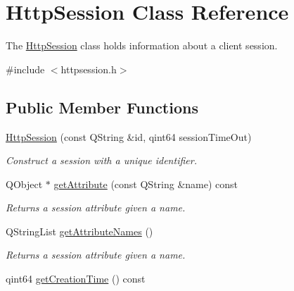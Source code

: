 \hypertarget{class_http_session}{}\section{Http\+Session Class Reference}
\label{class_http_session}


The \hyperlink{class_http_session}{Http\+Session} class holds information about a client session.  




{\ttfamily \#include $<$httpsession.\+h$>$}

\subsection*{Public Member Functions}
\begin{DoxyCompactItemize}
\item 
\mbox{\label{class_http_session_ad457562a38cadf2268b8268ee30bd90b}} 
\hyperlink{class_http_session_ad457562a38cadf2268b8268ee30bd90b}{Http\+Session} (const Q\+String \&id, qint64 session\+Time\+Out)
\begin{DoxyCompactList}\small\item\em Construct a session with a unique identifier. \end{DoxyCompactList}\item 
Q\+Object $\ast$ \hyperlink{class_http_session_acef8380ce20f3adb9d2bb9aad0ff3f46}{get\+Attribute} (const Q\+String \&name) const
\begin{DoxyCompactList}\small\item\em Returns a session attribute given a name. \end{DoxyCompactList}\item 
\mbox{\label{class_http_session_aca7b24bde0466a8140c30f6642c8dfc4}} 
Q\+String\+List \hyperlink{class_http_session_aca7b24bde0466a8140c30f6642c8dfc4}{get\+Attribute\+Names} ()
\begin{DoxyCompactList}\small\item\em Returns a session attribute given a name. \end{DoxyCompactList}\item 
\mbox{\label{class_http_session_a2904b92fb73b8cead32068611878a9eb}} 
qint64 \hyperlink{class_http_session_a2904b92fb73b8cead32068611878a9eb}{get\+Creation\+Time} () const

\end{DoxyCompactItemize}
